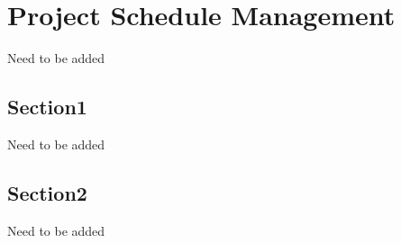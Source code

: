\chapter{Project Schedule Management}
Need to be added
\section{Section1}
Need to be added
\section{Section2}
Need to be added